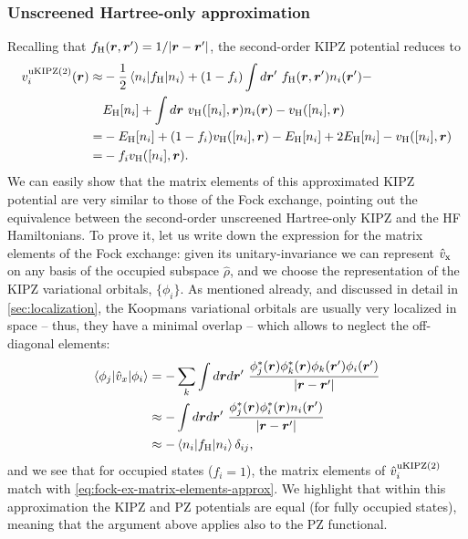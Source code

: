 \subsubsection*{Unscreened Hartree-only approximation}
Recalling that $f_{\rm H}({\bm r},{\bm r}') = 1/|{\bm r}-{\bm r}'|$, the second-order KIPZ potential reduces to
%
\begin{equation}
    \begin{split}
        v^{\rm uKIPZ(2)}_i({\bm r}) \approx &- \frac{1}{2} \braket{n_i|f_{\rm H}|n_i} + (1-f_i) \int d{\bm r}' \ f_{\rm H}({\bm r},{\bm r}') n_i({\bm r}') - \\
        &E_{\rm H}[n_i] + \int d{\bm r} \ v_{\rm H}([n_i],{\bm r}) n_i({\bm r}) - v_{\rm H}([n_i],{\bm r}) \\
        = &- E_{\rm H}[n_i] + (1-f_i) v_{\rm H}([n_i],{\bm r}) - E_{\rm H}[n_i] + 2 E_{\rm H}[n_i] - v_{\rm H}([n_i],{\bm r}) \\
        = &- f_i  v_{\rm H}([n_i],{\bm r}) .
    \end{split}
    \label{eq:kipz-potential-hartree-unscreened}
\end{equation}
%
We can easily show that the matrix elements of this approximated KIPZ potential are very similar to those of the Fock exchange, pointing out the equivalence between the second-order unscreened Hartree-only KIPZ and the HF Hamiltonians. To prove it, let us write down the expression for the matrix elements of the Fock exchange: given its unitary-invariance we can represent $\hat{v}_{\rm x}$ on any basis of the occupied subspace $\hat{\rho}$, and we choose the representation of the KIPZ variational orbitals, $\{ \phi_i \}$. As mentioned already, and discussed in detail in \cref{sec:localization}, the Koopmans variational orbitals are usually very localized in space -- thus, they have a minimal overlap -- which allows to neglect the off-diagonal elements:
%
\begin{equation}
    \begin{split}
        \braket{\phi_j|\hat{v}_x|\phi_i} &= - \sum_k \int d{\bm r} d{\bm r}' \ \frac{\phi_j^*({\bm r}) \phi_k^*({\bm r}) \phi_k({\bm r}') \phi_i({\bm r}')}{|{\bm r}-{\bm r}'|} \\
        &\approx - \int d{\bm r} d{\bm r}' \ \frac{\phi_j^*({\bm r}) \phi_i^*({\bm r}) n_i({\bm r}')}{|{\bm r}-{\bm r}'|} \\
        &\approx - \braket{n_i|f_{\rm H}|n_i} \delta_{ij} ,
    \end{split}
    \label{eq:fock-ex-matrix-elements-approx}
\end{equation}
%
and we see that for occupied states ($f_i=1$), the matrix elements of $\hat{v}^{\rm uKIPZ(2)}_i$ match with \cref{eq:fock-ex-matrix-elements-approx}. We highlight that within this approximation the KIPZ and PZ potentials are equal (for fully occupied states), meaning that the argument above applies also to the PZ functional.


